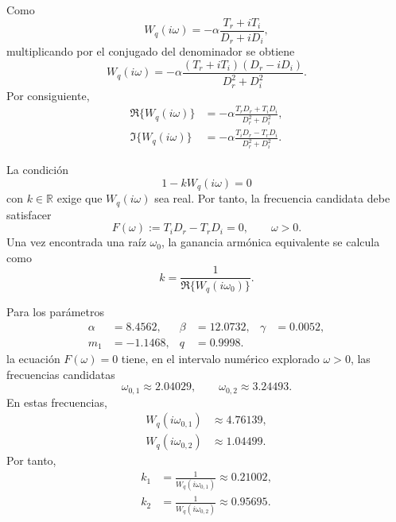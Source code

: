 \documentclass[journal]{IEEEtran}
\begin{document}
Como
\[
W_q(i\omega)
=
-\alpha\frac{T_r+iT_i}{D_r+iD_i},
\]
multiplicando por el conjugado del denominador se obtiene
\[
W_q(i\omega)
=
-\alpha
\frac{(T_r+iT_i)(D_r-iD_i)}{D_r^2+D_i^2}.
\]
Por consiguiente,
\begin{equation}
\label{eq:ReImW_ns}
\begin{aligned}
\Re\{W_q(i\omega)\}
&=
-\alpha
\frac{T_rD_r+T_iD_i}{D_r^2+D_i^2},\\
\Im\{W_q(i\omega)\}
&=
-\alpha
\frac{T_iD_r-T_rD_i}{D_r^2+D_i^2}.
\end{aligned}
\end{equation}

La condición
\[
1-kW_q(i\omega)=0
\]
con \(k\in\mathbb R\) exige que \(W_q(i\omega)\) sea real. Por tanto,
la frecuencia candidata debe satisfacer
\begin{equation}
\label{eq:Fomega_ns}
F(\omega)
:=
T_iD_r-T_rD_i
=
0,
\qquad
\omega>0.
\end{equation}
Una vez encontrada una raíz \(\omega_0\), la ganancia armónica equivalente se calcula como
\begin{equation}
\label{eq:k_omega_ns}
k
=
\frac{1}{\Re\{W_q(i\omega_0)\}}.
\end{equation}

Para los parámetros
\[
\begin{aligned}
\alpha&=8.4562, & \beta&=12.0732, & \gamma&=0.0052,\\
m_1&=-1.1468, & q&=0.9998.
\end{aligned}
\]
la ecuación \(F(\omega)=0\) tiene, en el intervalo numérico explorado
\(\omega>0\), las frecuencias candidatas
\[
\omega_{0,1}\approx 2.04029,
\qquad
\omega_{0,2}\approx 3.24493.
\]
En estas frecuencias,
\[
\begin{aligned}
W_q(i\omega_{0,1})&\approx 4.76139,\\
W_q(i\omega_{0,2})&\approx 1.04499.
\end{aligned}
\]
Por tanto,
\[
\begin{aligned}
k_1&=\frac{1}{W_q(i\omega_{0,1})}\approx 0.21002,\\
k_2&=\frac{1}{W_q(i\omega_{0,2})}\approx 0.95695.
\end{aligned}
\]

\end{document}
